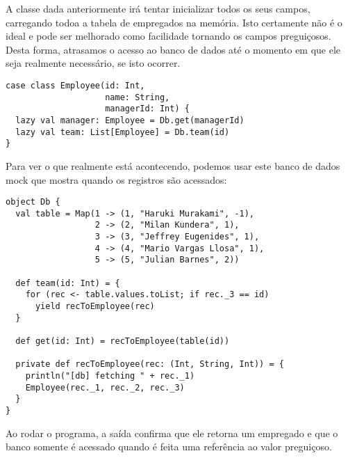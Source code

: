 A classe \lstinline@Employee@ dada anteriormente irá tentar inicializar todos os seus campos, carregando todoa a tabela
de empregados na memória. Isto certamente não é o ideal e pode ser melhorado como facilidade tornando os campos
preguiçosos. Desta forma, atrasamos o acesso ao banco de dados até o momento em que ele seja realmente necessário, se isto ocorrer.
\begin{lstlisting}
case class Employee(id: Int, 
                    name: String, 
                    managerId: Int) {
  lazy val manager: Employee = Db.get(managerId)
  lazy val team: List[Employee] = Db.team(id)
}
\end{lstlisting}
Para ver o que realmente está acontecendo, podemos usar este banco de dados mock
que mostra quando os registros são acessados:
\begin{lstlisting}
object Db {
  val table = Map(1 -> (1, "Haruki Murakami", -1),
                  2 -> (2, "Milan Kundera", 1),
                  3 -> (3, "Jeffrey Eugenides", 1),
                  4 -> (4, "Mario Vargas Llosa", 1),
                  5 -> (5, "Julian Barnes", 2))

  def team(id: Int) = {
    for (rec <- table.values.toList; if rec._3 == id)
      yield recToEmployee(rec)
  }

  def get(id: Int) = recToEmployee(table(id))

  private def recToEmployee(rec: (Int, String, Int)) = {
    println("[db] fetching " + rec._1)
    Employee(rec._1, rec._2, rec._3)
  }
}
\end{lstlisting}
Ao rodar o programa, a saída confirma que ele retorna um empregado e que
o banco somente é acessado quando é feita uma referência ao valor preguiçoso.

